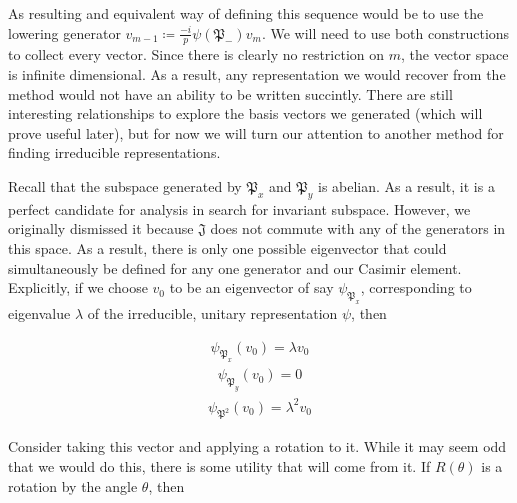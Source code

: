 \documentclass[10pt]{ucthesis}
\begin{document}
As resulting and equivalent way of defining this sequence would be to use the lowering generator $v_{m-1} \coloneq \frac{-i}{p}\psi(\mathfrak{P}_-)v_m$. We will need to use both constructions to collect every vector. Since there is clearly no restriction on $m$, the vector space is infinite dimensional. As a result, any representation we would recover from the method would not have an ability to be written succintly. There are still interesting relationships to explore the basis vectors we generated (which will prove useful later), but for now we will turn our attention to another method for finding irreducible representations.

Recall that the subspace generated by $\mathfrak{P}_x$ and $\mathfrak{P}_y$ is abelian. As a result, it is a perfect candidate for analysis in search for invariant subspace. However, we originally dismissed it because $\mathfrak{J}$ does not commute with any of the generators in this space. As a result, there is only one possible eigenvector that could simultaneously be defined for any one generator and our Casimir element. Explicitly, if we choose $v_0$ to be an eigenvector of say $\psi_{\mathfrak{P}_x}$, corresponding to eigenvalue $\lambda$ of the irreducible, unitary representation $\psi$, then 

\begin{equation}
\begin{aligned}
	\psi_{\mathfrak{P}_x}(v_0) = \lambda v_0
\end{aligned}
\end{equation}
\begin{equation}
\begin{aligned}
	\psi_{\mathfrak{P}_y}(v_0) = 0
\end{aligned}
\end{equation}
\begin{equation}
\begin{aligned}
	\psi_{\mathfrak{P}^2}(v_0) = \lambda^2 v_0
\end{aligned}
\end{equation}

Consider taking this vector and applying a rotation to it. While it may seem odd that we would do this, there is some utility that will come from it. If $R(\theta)$ is a rotation by the angle $\theta$, then
\end{document}
